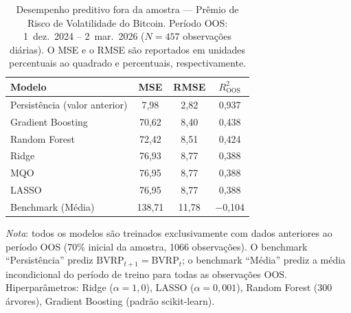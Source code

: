 \begin{table}[H]
\centering
\small
\caption{Desempenho preditivo fora da amostra --- Prêmio de Risco de Volatilidade do Bitcoin.
Período OOS\@: 1~dez.\ 2024 -- 2~mar.\ 2026 ($N=457$ observações diárias).
O MSE e o RMSE são reportados em unidades percentuais ao quadrado e percentuais, respectivamente.}
\label{tab:prev-desempenho}
\begin{tabular}{lccc}
\toprule
Modelo & MSE & RMSE & $R^2_{\text{OOS}}$ \\
\midrule
Persistência (valor anterior) & 7,98 & 2,82 & 0,937 \\
Gradient Boosting & 70,62 & 8,40 & 0,438 \\
Random Forest & 72,42 & 8,51 & 0,424 \\
Ridge & 76,93 & 8,77 & 0,388 \\
MQO & 76,95 & 8,77 & 0,388 \\
LASSO & 76,95 & 8,77 & 0,388 \\
\midrule
Benchmark (Média) & 138,71 & 11,78 & $-$0,104 \\
\bottomrule
\end{tabular}
\par\smallskip
\footnotesize\textit{Nota}: todos os modelos são treinados exclusivamente com dados anteriores ao período OOS (70\% inicial da amostra, 1066 observações). O benchmark ``Persistência'' prediz $\text{BVRP}_{t+1}=\text{BVRP}_t$; o benchmark ``Média'' prediz a média incondicional do período de treino para todas as observações OOS. Hiperparâmetros: Ridge ($\alpha=1{,}0$), LASSO ($\alpha=0{,}001$), Random Forest (300 árvores), Gradient Boosting (padrão scikit-learn).
\end{table}